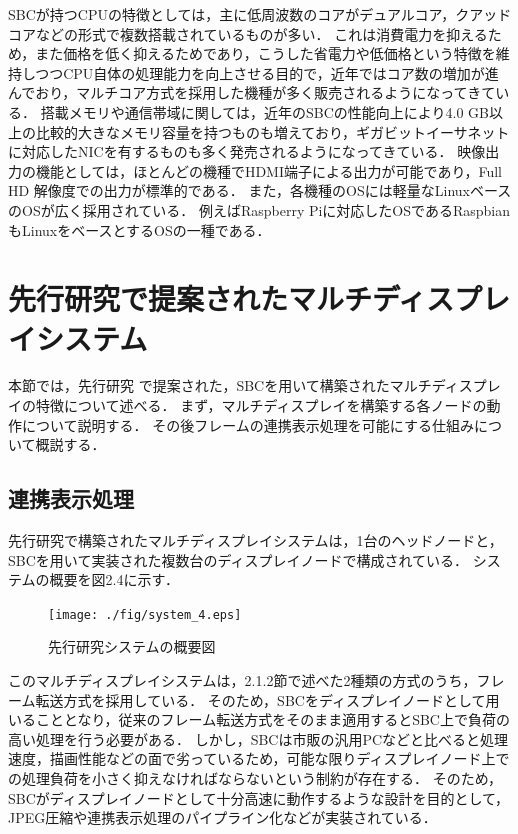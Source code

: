 SBCが持つCPUの特徴としては，主に低周波数のコアがデュアルコア，クアッドコアなどの形式で複数搭載されているものが多い．
これは消費電力を抑えるため，また価格を低く抑えるためであり，こうした省電力や低価格という特徴を維持しつつCPU自体の処理能力を向上させる目的で，近年ではコア数の増加が進んでおり，マルチコア方式を採用した機種が多く販売されるようになってきている．
搭載メモリや通信帯域に関しては，近年のSBCの性能向上により4.0 GB以上の比較的大きなメモリ容量を持つものも増えており，ギガビットイーサネットに対応したNICを有するものも多く発売されるようになってきている．
映像出力の機能としては，ほとんどの機種でHDMI端子による出力が可能であり，Full HD 解像度での出力が標準的である．
また，各機種のOSには軽量なLinuxベースのOSが広く採用されている．
例えばRaspberry Piに対応したOSであるRaspbian \cite{raspbian}もLinuxをベースとするOSの一種である．



\section{先行研究で提案されたマルチディスプレイシステム}

本節では，先行研究 \cite{Ishida}で提案された，SBCを用いて構築されたマルチディスプレイの特徴について述べる．
まず，マルチディスプレイを構築する各ノードの動作について説明する．
その後フレームの連携表示処理を可能にする仕組みについて概説する．

\subsection*{連携表示処理}

先行研究で構築されたマルチディスプレイシステムは，1台のヘッドノードと，SBCを用いて実装された複数台のディスプレイノードで構成されている．
システムの概要を図2.4に示す．

\begin{figure}[H]
  \hspace*{\fill}
  \texttt{[image: ./fig/system\_4.eps]}
  \hspace*{\fill}
  \label{fig_2.4}
  \caption{先行研究システムの概要図}
 \end{figure}

このマルチディスプレイシステムは，2.1.2節で述べた2種類の方式のうち，フレーム転送方式を採用している．
そのため，SBCをディスプレイノードとして用いることとなり，従来のフレーム転送方式をそのまま適用するとSBC上で負荷の高い処理を行う必要がある．
しかし，SBCは市販の汎用PCなどと比べると処理速度，描画性能などの面で劣っているため，可能な限りディスプレイノード上での処理負荷を小さく抑えなければならないという制約が存在する．
そのため，SBCがディスプレイノードとして十分高速に動作するような設計を目的として，JPEG圧縮や連携表示処理のパイプライン化などが実装されている．

